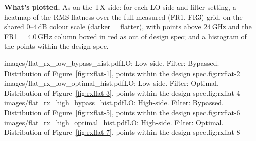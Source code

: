 \textbf{What's plotted.} As on the TX side: for each LO side and filter setting, a heatmap of the RMS flatness over
the full measured (FR1, FR3) grid, on the shared 0--4\,dB colour scale (darker = flatter), with points above 24\,GHz
and the FR1 = 4.0\,GHz column boxed in red as out of design spec; and a histogram of the points within the design spec.

%
        {images/flat_rx_low_bypass_hist.pdf}{LO: Low-side. Filter: Bypassed. Distribution of
Figure~\ref{fig:rxflat-1}, points within the design spec.}{fig:rxflat-2}
%
        {images/flat_rx_low_optimal_hist.pdf}{LO: Low-side. Filter: Optimal. Distribution of
Figure~\ref{fig:rxflat-3}, points within the design spec.}{fig:rxflat-4}
\clearpage
{}%
        {images/flat_rx_high_bypass_hist.pdf}{LO: High-side. Filter: Bypassed. Distribution of
Figure~\ref{fig:rxflat-5}, points within the design spec.}{fig:rxflat-6}
%
        {images/flat_rx_high_optimal_hist.pdf}{LO: High-side. Filter: Optimal. Distribution of
Figure~\ref{fig:rxflat-7}, points within the design spec.}{fig:rxflat-8}
\flushbottom
